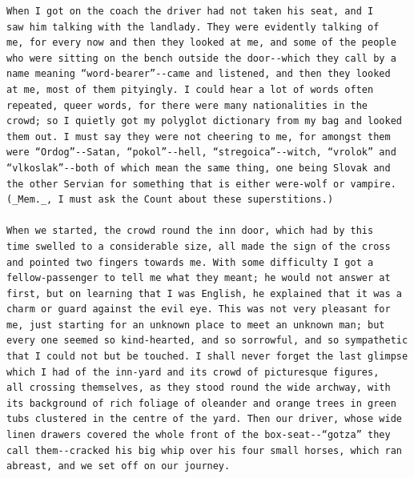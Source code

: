 \documentclass{article}
\begin{document}
\begin{verbatim}
When I got on the coach the driver had not taken his seat, and I
saw him talking with the landlady. They were evidently talking of
me, for every now and then they looked at me, and some of the people
who were sitting on the bench outside the door--which they call by a
name meaning “word-bearer”--came and listened, and then they looked
at me, most of them pityingly. I could hear a lot of words often
repeated, queer words, for there were many nationalities in the
crowd; so I quietly got my polyglot dictionary from my bag and looked
them out. I must say they were not cheering to me, for amongst them
were “Ordog”--Satan, “pokol”--hell, “stregoica”--witch, “vrolok” and
“vlkoslak”--both of which mean the same thing, one being Slovak and
the other Servian for something that is either were-wolf or vampire.
(_Mem._, I must ask the Count about these superstitions.)

When we started, the crowd round the inn door, which had by this
time swelled to a considerable size, all made the sign of the cross
and pointed two fingers towards me. With some difficulty I got a
fellow-passenger to tell me what they meant; he would not answer at
first, but on learning that I was English, he explained that it was a
charm or guard against the evil eye. This was not very pleasant for
me, just starting for an unknown place to meet an unknown man; but
every one seemed so kind-hearted, and so sorrowful, and so sympathetic
that I could not but be touched. I shall never forget the last glimpse
which I had of the inn-yard and its crowd of picturesque figures,
all crossing themselves, as they stood round the wide archway, with
its background of rich foliage of oleander and orange trees in green
tubs clustered in the centre of the yard. Then our driver, whose wide
linen drawers covered the whole front of the box-seat--“gotza” they
call them--cracked his big whip over his four small horses, which ran
abreast, and we set off on our journey.


\end{verbatim}
\end{document}
